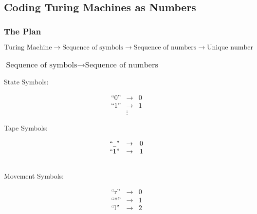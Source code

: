 \documentclass[12pt]{extarticle}
\newcommand{\ub}{\ensuremath{\underline{\enspace}}}
\begin{document}
\subsection{Coding Turing Machines as Numbers}
\label{sec:numbering}

\subsubsection*{The Plan}


\[
\text{Turing Machine} \rightarrow \text{Sequence of symbols} \rightarrow
\text{Sequence of numbers} \rightarrow  \text{Unique number}
\]


\newpage

\subsubsection*{$\text{Sequence of symbols} \rightarrow \text{Sequence of numbers}$}


\begin{multicols}{3}



\begin{center}State Symbols:
\end{center}
\[
\begin{array}{ccc}
\text{``0''} &\rightarrow &\text{0}\\
\text{``1''} &\rightarrow &\text{1}\\
 &\vdots &
\end{array}
\]

\columnbreak

\begin{center}Tape Symbols:
\end{center}
\[
\begin{array}{ccc}
\text{``\ub''} &\rightarrow &\text{0}\\
\text{``$1$''} &\rightarrow &\text{1}\\
\
\end{array}
\]

\columnbreak

\begin{center}Movement Symbols:
\end{center}
\[
\begin{array}{ccc}
\text{``r''} &\rightarrow &\text{0}\\
\text{``$*$''} &\rightarrow &\text{1}\\
\text{``l''} &\rightarrow &\text{2}
\end{array}
\]



\end{multicols}
\end{document}
